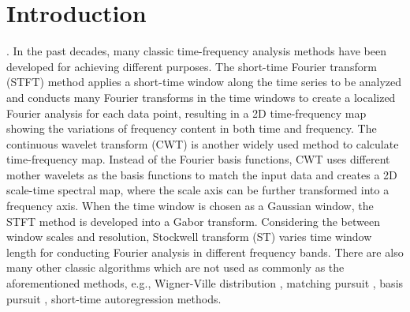 
\maketitle
\section{Introduction}
 \cite[]{tary2014spectral}. In the past decades, many classic time-frequency analysis methods have been developed for achieving different purposes. The short-time Fourier transform (STFT) method \cite[]{allen1977unified} applies a short-time window along the time series to be analyzed and conducts many Fourier transforms in the time windows to create a localized Fourier analysis for each data point, resulting in a 2D time-frequency map showing the variations of frequency content in both time and frequency. The continuous wavelet transform (CWT) \cite[]{rioul1992fast} is another widely used method to calculate  time-frequency map. Instead of the Fourier basis functions, CWT uses different mother wavelets as the basis functions to match the input data and creates a 2D scale-time spectral map, where the scale axis can be further transformed into a frequency axis. When the time window is chosen as a Gaussian window, the STFT method is developed into a Gabor transform. Considering the  between window scales and resolution,  Stockwell transform (ST) \cite[]{stockwell1996localization,zixiang2017bgs} varies time window length for conducting Fourier analysis in different frequency bands. There are also many other classic algorithms which are not used as commonly as the aforementioned methods, e.g., Wigner-Ville distribution \cite[]{boashash1987efficient}, matching pursuit \cite[]{mallat1993matching}, basis pursuit \cite[]{chen2001atomic}, short-time autoregression \cite[]{burg1972relationship} methods.

